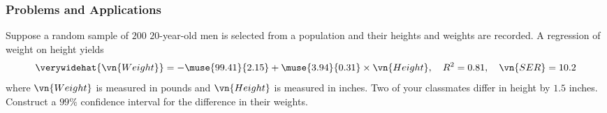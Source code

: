 

\begin{frame}
\frametitle{Problems and Applications}
Suppose a random sample of $200$ $20$-year-old men is selected from a population and their heights and weights are recorded. A regression of weight on height yields
\begin{align*}
\verywidehat{\vn{Weight}} 
  = -\muse{99.41}{2.15} + \muse{3.94}{0.31} \times \vn{Height},
  \quad R^2 = 0.81,
  \quad \vn{SER} = 10.2
\end{align*}
where $\vn{Weight}$ is measured in pounds and $\vn{Height}$ is measured in inches. Two of your classmates differ in height by $1.5$ inches. Construct a $99\%$ confidence interval for the difference in their weights.
\end{frame}

